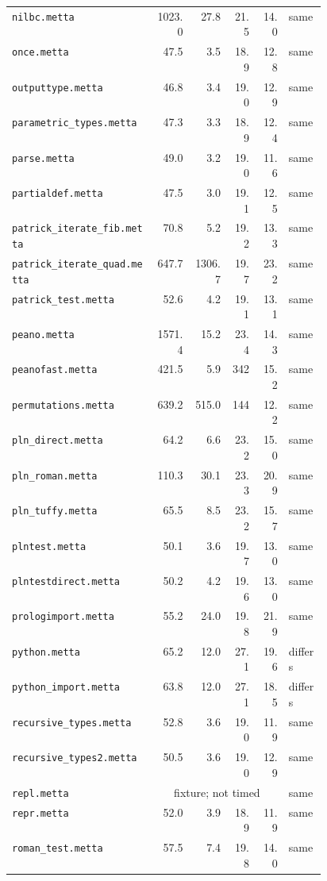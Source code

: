 \begin{longtable}{@{}p{0.46\linewidth}rrrrl@{}}
\nolinkurl{nilbc.metta} & 1023.0 & 27.8 & 21.5 & 14.0 & same \\
\nolinkurl{once.metta} & 47.5 & 3.5 & 18.9 & 12.8 & same \\
\nolinkurl{outputtype.metta} & 46.8 & 3.4 & 19.0 & 12.9 & same \\
\nolinkurl{parametric_types.metta} & 47.3 & 3.3 & 18.9 & 12.4 & same \\
\nolinkurl{parse.metta} & 49.0 & 3.2 & 19.0 & 11.6 & same \\
\nolinkurl{partialdef.metta} & 47.5 & 3.0 & 19.1 & 12.5 & same \\
\nolinkurl{patrick_iterate_fib.metta} & 70.8 & 5.2 & 19.2 & 13.3 & same \\
\nolinkurl{patrick_iterate_quad.metta} & 647.7 & 1306.7 & 19.7 & 23.2 & same \\
\nolinkurl{patrick_test.metta} & 52.6 & 4.2 & 19.1 & 13.1 & same \\
\nolinkurl{peano.metta} & 1571.4 & 15.2 & 23.4 & 14.3 & same \\
\nolinkurl{peanofast.metta} & 421.5 & 5.9 & 342 & 15.2 & same \\
\nolinkurl{permutations.metta} & 639.2 & 515.0 & 144 & 12.2 & same \\
\nolinkurl{pln_direct.metta} & 64.2 & 6.6 & 23.2 & 15.0 & same \\
\nolinkurl{pln_roman.metta} & 110.3 & 30.1 & 23.3 & 20.9 & same \\
\nolinkurl{pln_tuffy.metta} & 65.5 & 8.5 & 23.2 & 15.7 & same \\
\nolinkurl{plntest.metta} & 50.1 & 3.6 & 19.7 & 13.0 & same \\
\nolinkurl{plntestdirect.metta} & 50.2 & 4.2 & 19.6 & 13.0 & same \\
\nolinkurl{prologimport.metta} & 55.2 & 24.0 & 19.8 & 21.9 & same \\
\nolinkurl{python.metta} & 65.2 & 12.0 & 27.1 & 19.6 & differs \\
\nolinkurl{python_import.metta} & 63.8 & 12.0 & 27.1 & 18.5 & differs \\
\nolinkurl{recursive_types.metta} & 52.8 & 3.6 & 19.0 & 11.9 & same \\
\nolinkurl{recursive_types2.metta} & 50.5 & 3.6 & 19.0 & 12.9 & same \\
\nolinkurl{repl.metta} & \multicolumn{4}{c}{fixture; not timed} & same \\
\nolinkurl{repr.metta} & 52.0 & 3.9 & 18.9 & 11.9 & same \\
\nolinkurl{roman_test.metta} & 57.5 & 7.4 & 19.8 & 14.0 & same \\

\end{longtable}
